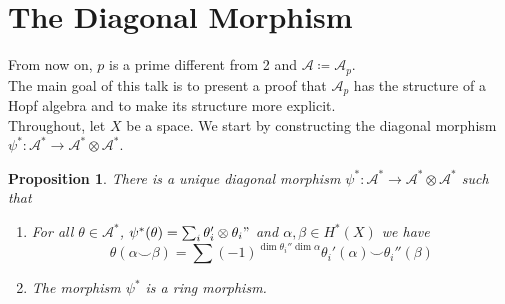 \documentclass[11pt, a4paper]{article}
\newtheorem{propo}[thm]{Proposition}
\theoremstyle{plain}
\begin{document}
\section{The Diagonal Morphism}
From now on, $p$ is a prime different from 2 and $\mathcal{A}\coloneq \mathcal{A}_p$.\\

The main goal of this talk is to present a proof that $\mathcal{A}_p$ has the structure of a Hopf algebra and to make its structure more explicit.\\
Throughout, let $X$ be a space.
We start by constructing the diagonal morphism $\psi^{\ast}\colon \mathcal{A}^{\ast} \to \mathcal{A}^{\ast} \otimes \mathcal{A}^{\ast}$.
\begin{propo}
	There is a unique diagonal morphism $\psi^{\ast}\colon \mathcal{A}^{\ast} \to  \mathcal{A}^{\ast} \otimes \mathcal{A}^{\ast}$ such that
	\begin{enumerate}
		\item For all $\theta \in  \mathcal{A}^{\ast}$, $\psi^{\ast}( \theta) = \sum_i \theta_i' \otimes \theta_i"$ and $\alpha,\beta \in H^{\ast}( X) $  we have
			\[ 
			\theta( \alpha\smile \beta) = \sum ( -1) ^{\dim \theta_i''\dim \alpha}\theta_i'( \alpha) \smile \theta_i''( \beta) 
			\]
			
	\item The morphism $\psi^{\ast}$ is a ring morphism.
	\end{enumerate}
\end{propo}
\end{document}
